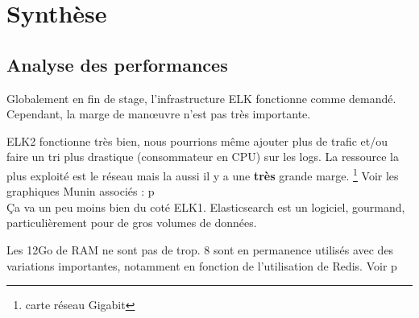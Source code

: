 %
%
%
%
\chapter{Synthèse}
\section{Analyse des performances}
Globalement en fin de stage, l'infrastructure ELK fonctionne comme demandé.
Cependant, la marge de manœuvre n'est pas très importante.

ELK2 fonctionne très bien, nous pourrions même ajouter plus de trafic et/ou faire
un tri plus drastique (consommateur en CPU) sur les logs. 
La ressource la plus exploité est le réseau mais la aussi il y a une \textbf{très} grande marge.
\footnote{carte réseau Gigabit}
Voir les graphiques \gls{Munin} associés :  p\pageref{fig:elk2cpu} \\[3mm]


Ça va un peu moins bien du coté ELK1. Elasticsearch est un logiciel, gourmand, particulièrement
pour de gros volumes de données. 

Les 12Go de RAM ne sont pas de trop. 8 sont en permanence utilisés avec des variations
importantes, notamment en fonction de l'utilisation de Redis. Voir p\pageref{fig:elk1memory}

